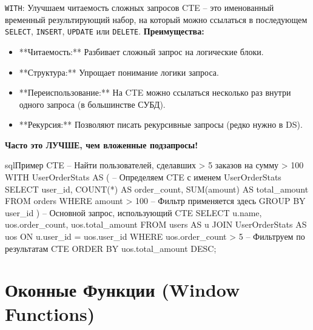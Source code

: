 \begin{myblock}{\texttt{WITH}: Улучшаем читаемость сложных запросов}
    CTE – это именованный временный результирующий набор, на который можно ссылаться в последующем \texttt{SELECT}, \texttt{INSERT}, \texttt{UPDATE} или \texttt{DELETE}.
    \textbf{Преимущества:}
    \begin{itemize}
        \item **Читаемость:** Разбивает сложный запрос на логические блоки.
        \item **Структура:** Упрощает понимание логики запроса.
        \item **Переиспользование:** На CTE можно ссылаться несколько раз внутри одного запроса (в большинстве СУБД).
        \item **Рекурсия:** Позволяют писать рекурсивные запросы (редко нужно в DS).
    \end{itemize}
    \textbf{Часто это ЛУЧШЕ, чем вложенные подзапросы!}
    \begin{codebox}{sql}{Пример CTE}
    -- Найти пользователей, сделавших > 5 заказов на сумму > 100
    WITH UserOrderStats AS ( -- Определяем CTE с именем UserOrderStats
        SELECT
            user_id,
            COUNT(*) AS order_count,
            SUM(amount) AS total_amount
        FROM orders
        WHERE amount > 100 -- Фильтр применяется здесь
        GROUP BY user_id
    )
    -- Основной запрос, использующий CTE
    SELECT
        u.name,
        uos.order_count,
        uos.total_amount
    FROM
        users AS u
    JOIN
        UserOrderStats AS uos ON u.user_id = uos.user_id
    WHERE
        uos.order_count > 5 -- Фильтруем по результатам CTE
    ORDER BY
        uos.total_amount DESC;
    \end{codebox}
\end{myblock}

\section{Оконные Функции (Window Functions)}

